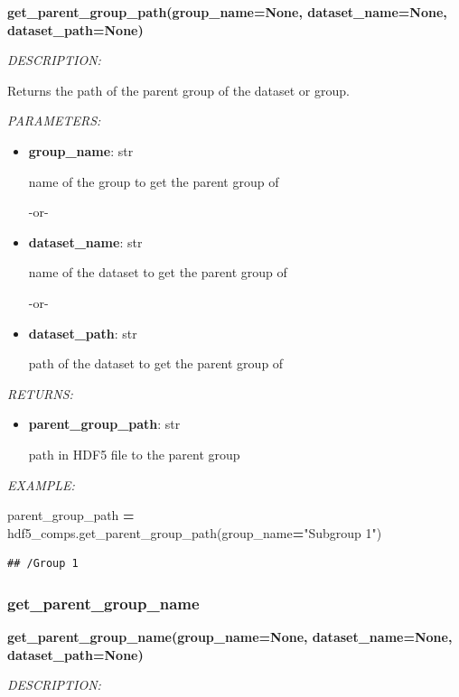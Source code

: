 \documentclass[
]{article}
\newenvironment{Shaded}{\begin{snugshade}}{\end{snugshade}}
\newcommand{\NormalTok}[1]{#1}
\newcommand{\OperatorTok}[1]{\textcolor[rgb]{0.81,0.36,0.00}{\textbf{#1}}}
\newcommand{\StringTok}[1]{\textcolor[rgb]{0.31,0.60,0.02}{#1}}
\begin{document}
\textbf{get\_parent\_group\_path(group\_name=None, dataset\_name=None, dataset\_path=None)}

\emph{DESCRIPTION:}

Returns the path of the parent group of the dataset or group.

\emph{PARAMETERS:}

\begin{itemize}
\item
  \textbf{group\_name}: str

  name of the group to get the parent group of

  -or-
\item
  \textbf{dataset\_name}: str

  name of the dataset to get the parent group of

  -or-
\item
  \textbf{dataset\_path}: str

  path of the dataset to get the parent group of
\end{itemize}

\emph{RETURNS:}

\begin{itemize}
\item
  \textbf{parent\_group\_path}: str

  path in HDF5 file to the parent group
\end{itemize}

\emph{EXAMPLE:}

\begin{Shaded}
\begin{Highlighting}[]
\NormalTok{parent_group_path }\OperatorTok{=}\NormalTok{ hdf5_comps.get_parent_group_path(group_name}\OperatorTok{=}\StringTok{"Subgroup 1"}\NormalTok{)}
\end{Highlighting}
\end{Shaded}

\begin{verbatim}
## /Group 1
\end{verbatim}

\hypertarget{get_parent_group_name}{%
\subsubsection{get\_parent\_group\_name}\label{get_parent_group_name}}

\textbf{get\_parent\_group\_name(group\_name=None, dataset\_name=None, dataset\_path=None)}

\emph{DESCRIPTION:}
\end{document}
